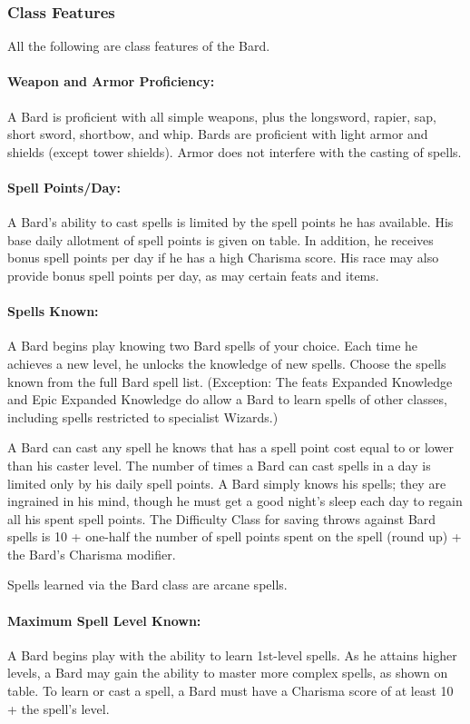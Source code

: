 \subsubsection{Class Features}
All the following are class features of the Bard.

\paragraph{Weapon and Armor Proficiency:} 
A Bard is proficient with all simple weapons, plus the longsword, rapier, sap, short sword, shortbow, and whip. 
Bards are proficient with light armor and shields (except tower shields).
Armor does not interfere with the casting of spells.

\paragraph{Spell Points/Day:} 
A Bard's ability to cast spells is limited by the spell points he has available. 
His base daily allotment of spell points is given on  table. 
In addition, he receives bonus spell points per day if he has a high Charisma score.
His race may also provide bonus spell points per day, as may certain feats and items.

\paragraph{Spells Known:} A Bard begins play knowing two Bard spells of your choice. 
Each time he achieves a new level, he unlocks the knowledge of new spells.
Choose the spells known from the full Bard spell list.
(Exception: The feats Expanded Knowledge and Epic Expanded Knowledge 
do allow a Bard to learn spells of other classes, 
including spells restricted to specialist Wizards.) 

A Bard can cast any spell he knows that has a spell point cost equal to or lower than his caster level.
The number of times a Bard can cast spells in a day is limited only by his daily spell points. 
A Bard simply knows his spells; they are ingrained in his mind, 
though he must get a good night's sleep each day to regain all his spent spell points.
The Difficulty Class for saving throws against Bard spells is 10 + one-half the number of spell points spent on the spell (round up) + the Bard's Charisma modifier. 

Spells learned via the Bard class are arcane spells.
\paragraph{Maximum Spell Level Known:} A Bard begins play with the ability to learn 1st-level spells. 
As he attains higher levels, a Bard may gain the ability to master more complex spells, as shown on  table.
To learn or cast a spell, a Bard must have a Charisma score of at least 10 + the spell's level.

